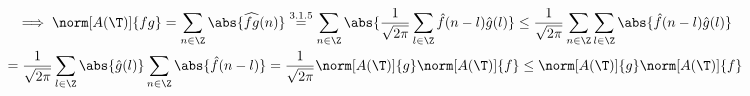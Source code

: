 \begin{solution}
\begin{enumerate}[label = (\roman*)]
    \begin{multline*}
        \implies
        \norm[A(\T)]{f g}
        =
        \sum_{n \in \Z}
        \abs{\widehat{f g}(n)}
        \stackrel
        {
            \mathrm{3.1.5}
        }{=}
        \sum_{n \in \Z}
        \abs
        {
            \frac{1}{\sqrt{2 \pi}}
            \sum_{l \in \Z}
            \hat f(n - l)
            \hat g(l)
        }
        \leq
        \frac{1}{\sqrt{2 \pi}}
        \sum_{n \in \Z}
        \sum_{l \in \Z}
        \abs
        {
            \hat f(n - l)
            \hat g(l)
        } \\
        =
        \frac{1}{\sqrt{2 \pi}}
        \sum_{l \in \Z}
        \abs{\hat g(l)}
        \sum_{n \in \Z}
        \abs{\hat f(n - l)}
        =
        \frac{1}{\sqrt{2 \pi}}
        \norm[A(\T)]{g}
        \norm[A(\T)]{f}
        \leq
        \norm[A(\T)]{g}
        \norm[A(\T)]{f}
    \end{multline*}

\end{enumerate}

\end{solution}

